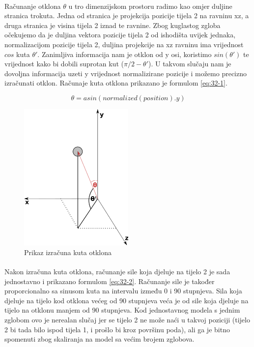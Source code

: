 \documentclass[times, utf8, diplomski]{fer}
\begin{document}
\paragraph{}
Računanje otklona $\theta$ u tro dimenzijskom prostoru radimo kao omjer duljine 
stranica trokuta. Jedna od stranica je projekcija pozicije tijela 2 na ravninu 
xz, a druga stranica je visina tijela 2 iznad te ravnine. Zbog kuglastog zgloba 
očekujemo da je duljina vektora pozicije tijela 2 od ishodišta uvijek jednaka, 
normalizacijom pozicije tijela 2, duljina projekcije na xz ravninu ima 
vrijednost $cos$ kuta $\theta'$. Zanimljiva informacija nam je otklon od y osi, koristimo 
$sin(\theta')$ te vrijednost kako bi dobili suprotan kut ($\pi / 2 - \theta'$). U takvom 
slučaju nam je dovoljna informacija uzeti y vrijednost normalizirane pozicije i možemo 
precizno izračunati otklon. Računaje kuta otklona prikazano je formulom \ref{eq:32-1}.

\begin{equation}
\theta = asin(normalized(position).y)
\label{eq:32-1}
\end{equation}

\begin{figure}[h]
	\centering
	\includegraphics[width=0.5\textwidth]{img/32-2}
	\caption{Prikaz izračuna kuta otklona}
	\label{fig:32-2}
\end{figure}


\paragraph{}
Nakon izračuna kuta otklona, računanje sile koja djeluje na tijelo 2 je sada jednostavno i 
prikazano formulom \ref{eq:32-2}. Računanje sile je također proporcionalno sa sinusom kuta 
na intervalu između 0 i 90 stupnjeva. Sila koja djeluje na tijelo kod otklona većeg od 90 
stupnjeva veća je od sile koja djeluje na tijelo na otklonu manjem od 90 stupnjeva. Kod 
jednostavnog modela s jednim zglobom ovo je nerealan slučaj jer se tijelo 2 ne može naći u  
takvoj poziciji (tijelo 2 bi tada bilo ispod tijela 1, i prošlo bi kroz površinu poda), ali 
ga je bitno spomenuti zbog skaliranja na model sa većim brojem zglobova.
\end{document}

